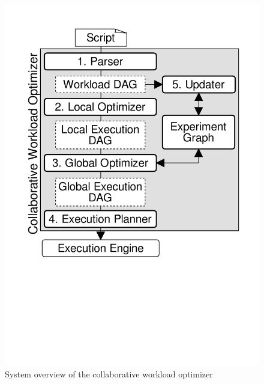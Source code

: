 \begin{figure}
\centering
\includegraphics[width=\columnwidth]{../images/system-workflow}
\caption{System overview of the collaborative workload optimizer}
\label{system-workflow}
\end{figure}


